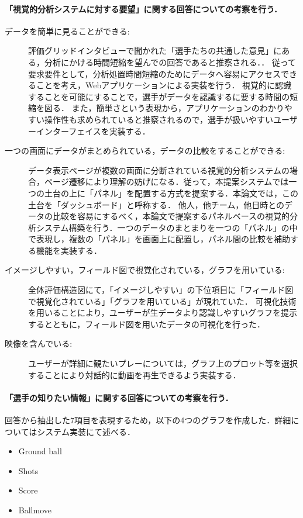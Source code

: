 \documentclass[sotsuron]{kuee}
\begin{document}
					\paragraph {「視覚的分析システムに対する要望」に関する回答についての考察を行う．}
						\begin{description}
							\item [データを簡単に見ることができる:]
							評価グリッドインタビューで聞かれた「選手たちの共通した意見」にある，分析にかける時間短縮を望んでの回答であると推察される．．
							従って要求要件として，分析処置時間短縮のためにデータへ容易にアクセスできることを考え，Webアプリケーションによる実装を行う．
							視覚的に認識することを可能にすることで，選手がデータを認識するに要する時間の短縮を図る．
							また，簡単さという表現から，アプリケーションのわかりやすい操作性も求められていると推察されるので，選手が扱いやすいユーザーインターフェイスを実装する．
							
							\item [一つの画面にデータがまとめられている，データの比較をすることができる:]
							データ表示ページが複数の画面に分断されている視覚的分析システムの場合，ページ遷移により理解の妨げになる．従って，本提案システムでは一つの土台の上に「パネル」を配置する方式を提案する．本論文では，この土台を「ダッシュボード」と呼称する．
							他人，他チーム，他日時とのデータの比較を容易にするべく，本論文で提案するパネルベースの視覚的分析システム構築を行う．一つのデータのまとまりを一つの「パネル」の中で表現し，複数の「パネル」を画面上に配置し，パネル間の比較を補助する機能を実装する．
							
							\item [イメージしやすい，フィールド図で視覚化されている，グラフを用いている:]
							全体評価構造図にて，「イメージしやすい」の下位項目に「フィールド図で視覚化されている」「グラフを用いている」が現れていた．
							可視化技術を用いることにより，ユーザーが生データより認識しやすいグラフを提示するとともに，フィールド図を用いたデータの可視化を行った．
							
							\item [映像を含んでいる:]
							ユーザーが詳細に観たいプレーについては，グラフ上のプロット等を選択することにより対話的に動画を再生できるよう実装する．
						\end{description}
					\paragraph {「選手の知りたい情報」に関する回答についての考察を行う．}
						回答から抽出した7項目を表現するため，以下の4つのグラフを作成した．詳細についてはシステム実装にて述べる．
							\begin{itemize}
								\item Ground ball
								\item Shots
								\item Score
								\item Ballmove
							\end{itemize}	
\end{document}
